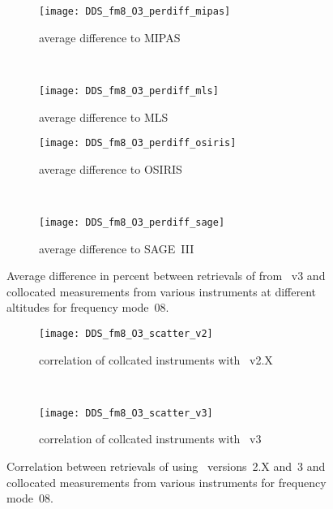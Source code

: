 \begin{figure}[htpb]
    \centering
    \begin{subfigure}[b]{0.49\textwidth}
        \texttt{[image: DDS\_fm8\_O3\_perdiff\_mipas]}
        \caption{average difference to MIPAS}
        \label{fig:fm08:O3:profiles:MIPAS}
    \end{subfigure}
    \,
    \begin{subfigure}[b]{0.49\textwidth}
        \texttt{[image: DDS\_fm8\_O3\_perdiff\_mls]}
        \caption{average difference to MLS}
        \label{fig:fm08:O3:profiles:MLS}
    \end{subfigure}

    \begin{subfigure}[b]{0.49\textwidth}
        \texttt{[image: DDS\_fm8\_O3\_perdiff\_osiris]}
        \caption{average difference to OSIRIS}
        \label{fig:fm08:O3:profiles:OSIRIS}
    \end{subfigure}
    \,
    \begin{subfigure}[b]{0.49\textwidth}
        \texttt{[image: DDS\_fm8\_O3\_perdiff\_sage]}
        \caption{average difference to SAGE~III}
        \label{fig:fm08:O3:profiles:SAGEIII}
    \end{subfigure}
    \caption{Average difference in percent between retrievals of 
    from \smr~v3 and collocated measurements from various instruments at
    different altitudes for frequency mode~08.}

    \label{fig:fm08:O3:profiles}
\end{figure}

\begin{figure}[htpb]
    \centering
    \begin{subfigure}[b]{0.49\textwidth}
        \texttt{[image: DDS\_fm8\_O3\_scatter\_v2]}
        \caption{correlation of collcated instruments with \smr~v2.X}
        \label{fig:fm08:O3:scatter:v2}
    \end{subfigure}
    \,
    \begin{subfigure}[b]{0.49\textwidth}
        \texttt{[image: DDS\_fm8\_O3\_scatter\_v3]}
        \caption{correlation of collcated instruments with \smr~v3}
        \label{fig:fm08:O3:scatter:v3}
    \end{subfigure}
    \caption{Correlation between retrievals of  using \smr\
    versions~2.X and~3 and collocated measurements from various instruments
    for frequency mode~08.}
    \label{fig:fm08:O3:scatter}
\end{figure}

